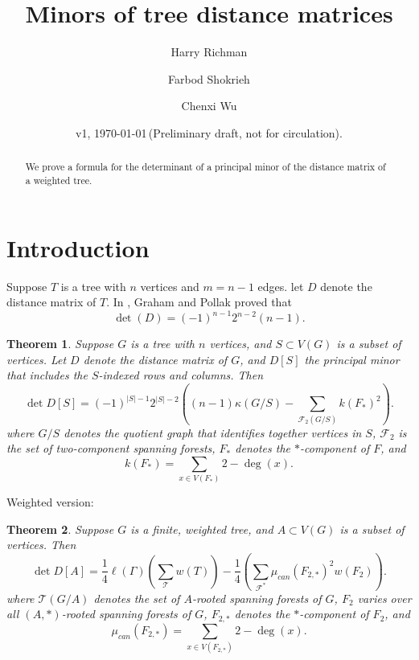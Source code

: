 \documentclass{amsart}
\newtheorem{thm}{Theorem}
\theoremstyle{definition}
\begin{document}
\title[Tree distance minors]{Minors of tree distance matrices}
\author{Harry Richman}
\author{Farbod Shokrieh}
\author{Chenxi Wu}
\date{v1, \today  \,(Preliminary draft, not for circulation).}


\begin{abstract}
We prove a formula for the determinant of 
a principal minor of
the distance matrix of a weighted tree.
\end{abstract}
\maketitle

\setcounter{tocdepth}{1}
\tableofcontents

\section{Introduction}

Suppose $T$ is a tree with $n$ vertices and $m=n-1$ edges.
let $D$ denote the distance matrix of $T$.
In
\cite{graham-pollak},
Graham and Pollak proved that
\begin{equation}
\det(D) = (-1)^{n-1} 2^{n-2} (n-1). 
\end{equation}

\begin{thm}
\label{thm:main}
Suppose $G$ is a tree with $n$ vertices, and $S \subset V(G)$ is a subset of vertices.
Let $D$ denote the distance matrix of $G$,
and $D[S]$ the principal minor that includes the $S$-indexed rows and columns.
Then
\begin{equation}\label{eq:main}
\det D[S] = (-1)^{|S|-1} 2^{|S|-2} \left( (n-1) \kappa(G/S)  - \sum_{\mathcal F_2(G/S)} k(F_{*})^2  \right).
\end{equation}
where 
$G/S$ denotes the quotient graph that identifies together vertices in $S$,
$\mathcal F_2$ is the set of two-component spanning forests,
$F_{*}$ denotes the $*$-component of $F$, 
and
\begin{equation*}
k(F_{*}) 
= \sum_{x \in V( F_{*})} {2 - \deg(x)}.
\end{equation*}
\end{thm}

Weighted version:
\begin{thm}
\label{thm:w-max-capacity}
Suppose $G$ is a finite, weighted tree, and $A \subset V(G)$ is a subset of vertices.
Then
\begin{equation}\label{eq:w-max-capacity}
\det D[A] = \frac14 \ell(\Gamma)\left( \sum_{\mathcal T} w(T) \right) - \frac14 \left( \sum_{\mathcal F^*} \mu_{can}(F_{2,*})^2 w(F_2) \right).
\end{equation}
where 
$\mathcal T(G/A)$ denotes the set of $A$-rooted spanning forests of $G$,
$F_2$ varies over all $(A,*)$-rooted spanning forests of $G$,
$F_{2,*}$ denotes the $*$-component of $F_2$, 
and
\begin{equation}
\mu_{can}(F_{2,*}) 
= \sum_{x \in V( F_{2,*})} {2 - \deg(x)}.
\end{equation}
\end{thm}
\end{document}
